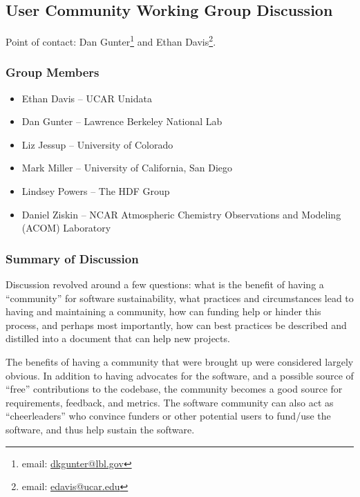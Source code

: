 \subsection{User Community Working Group Discussion}
\label{sec:appendix_user_community}

Point of contact:
Dan Gunter\footnote{email: \href{mailto:dkgunter@lbl.gov}{dkgunter@lbl.gov}} and 
Ethan Davis\footnote{email: \href{mailto:edavis@ucar.edu}{edavis@ucar.edu}}.

\subsubsection{Group Members}

\begin{itemize}
\item Ethan Davis -- UCAR Unidata
\item Dan Gunter -- Lawrence Berkeley National Lab
\item Liz Jessup -- University of Colorado
\item Mark Miller -- University of California, San Diego
\item Lindsey Powers -- The HDF Group
\item Daniel Ziskin -- NCAR Atmospheric Chemistry Observations and Modeling (ACOM) Laboratory
\end{itemize}

\subsubsection{Summary of Discussion}

Discussion revolved around a few questions: what is the benefit of having a
``community'' for software sustainability, what practices and circumstances lead
to having and maintaining a community, how can funding help or hinder this
process, and perhaps most importantly, how can best practices be described and
distilled into a document that can help new projects.

The benefits of having a community that were brought up were considered largely
obvious. In addition to having advocates for the software, and a possible source
of ``free'' contributions to the codebase, the community becomes a good source
for requirements, feedback, and metrics. The software community can also act as
``cheerleaders'' who convince funders or other potential users to fund/use the
software, and thus help sustain the software.

